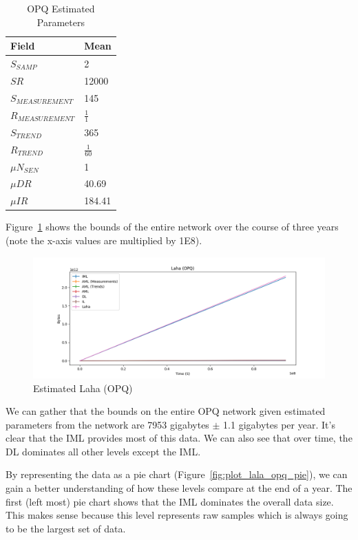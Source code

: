 \begin{table}[H]
	\centering
	\caption{OPQ Estimated Parameters}
	\begin{tabularx}{\textwidth}{ll}
		\toprule
		\textbf{Field} & \textbf{Mean} \\
		\midrule
		$S_{SAMP}$ & 2 \\
		$SR$ & 12000 \\
		$S_{MEASUREMENT}$ & 145 \\
		$R_{MEASUREMENT}$ & $\frac{1}{1}$ \\
		$S_{TREND}$ & 365  \\
		$R_{TREND}$ & $\frac{1}{60}$  \\
		$\mu N_{SEN}$ & 1  \\
		$\mu DR$ & 40.69  \\
		$\mu IR$ & 184.41 \\
		\bottomrule
	\end{tabularx}
	\label{table:estimated_laha_opq}
\end{table}

Figure~\ref{fig:plot_lala_opq} shows the bounds of the entire network over the course of three years (note the x-axis values are multiplied by 1E8).

\begin{figure}[H]
	\centering
	\includegraphics[width=\linewidth]{figures/plot_laha_opq.png}
	\caption{Estimated Laha (OPQ)}
	\label{fig:plot_lala_opq}
\end{figure}

We can gather that the bounds on the entire OPQ network given estimated parameters from the network are 7953 gigabytes $\pm$ 1.1 gigabytes per year. It's clear that the IML provides most of this data. We can also see that over time, the DL dominates all other levels except the IML\@.

By representing the data as a pie chart (Figure~\ref{fig:plot_lala_opq_pie}), we can gain a better understanding of how these levels compare at the end of a year. The first (left most) pie chart shows that the IML dominates the overall data size. This makes sense because this level represents raw samples which is always going to be the largest set of data.

